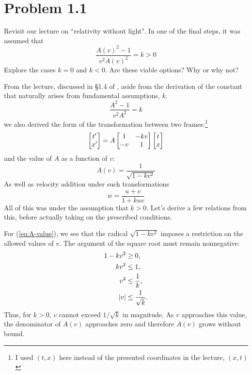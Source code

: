 \documentclass[12pt,a4paper]{article}
\begin{document}
	
	\section*{
		Problem 1.1
	}
	\begin{problem}
		Revisit our lecture on ``relativity without light". 
		In one of the final steps, it was assumed that
		\begin{equation}
			\label{eq:1.1}
		    \frac{A(v)^2-1}{v^2 A(v)^2} = k > 0 
		\end{equation}
		Explore the cases $k = 0$ and $k < 0$. 
		Are these viable options? Why or why not?
	\end{problem}
	\begin{solution_pset}
		\nocite{juan2026}

		From the lecture, discussed in \S 1.4 of \cite{juan2026}, aside from the
		derivation of the constant that naturally arises 
		from fundamental assumptions, $k$.
		\begin{equation}
			\label{eq:k-constant}
		    \frac{A^2 - 1}{v^2 A^2} = k 
		\end{equation}
		we also derived the form of the transformation
		between two frames:\footnote{I used $(t,x)$ here
		instead of the presented coordinates in the lecture, 
		$(x,t)$}
		\begin{equation}
			\label{eq:transform}
		    \bmqty{
		    	t'\\x'
		    } 
			=
			A
			\bmqty{
				1  & -kv \\
				-v & 1
			} 
			\bmqty{
				t\\x
			} 
		\end{equation}
		and the value of $A$ as a function of $v$:
		\begin{equation}
			\label{eq:A-value}
			A(v) =
			\frac{1}{\sqrt{1-kv^2}} 
		\end{equation}
		As well as velocity addition under such transformations
		\begin{equation}
			\label{eq:velocity-addition}
		    w
			=
			\frac{u+v}{1+kuv} 
		\end{equation}
		All of this was under the assumption that $k>0$.
		Let's derive a few relations from this, before actually
		taking on the prescribed conditions.

		For (\ref{eq:A-value}), we see that the radical
		$\sqrt{1-kv^2}$ imposes a restriction on the allowed values
		of $v$. The argument of the square root must remain
		nonnegative:
		\begin{align*}
			1-kv^2 &\geq 0,\\
			kv^2 &\leq 1,\\
			v^2 &\leq \frac{1}{k},\\
			\abs{v} &\leq \frac{1}{\sqrt{k}}.
		\end{align*}
		Thus, for $k>0$, $v$ cannot exceed $1/\sqrt{k}$ in magnitude.
		As $v$ approaches this value, the denominator of $A(v)$
		approaches zero and therefore $A(v)$ grows without bound.
		

\end{solution_pset}
\end{document}
